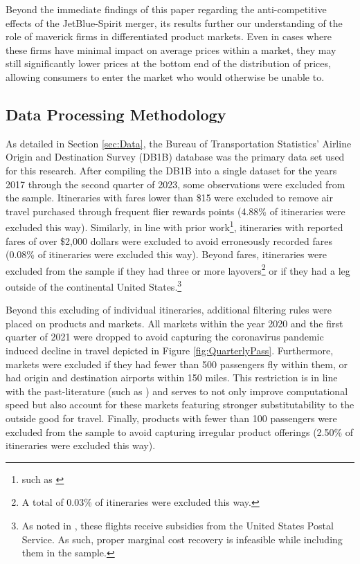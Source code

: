 \documentclass{article}
\begin{document}
    Beyond the immediate findings of this paper regarding the anti-competitive effects of the JetBlue-Spirit merger, its results further our understanding of the role of maverick firms in differentiated product markets. Even in cases where these firms have minimal impact on average prices within a market, they may still significantly lower prices at the bottom end of the distribution of prices, allowing consumers to enter the market who would otherwise be unable to. 
    
	
	\pagebreak 
	 
	
	\FloatBarrier
	
\pagebreak 
\begin{appendices}
\setcounter{table}{0}
\setcounter{figure}{0}
\renewcommand{\thetable}{\Alph{section}\arabic{table}}
\renewcommand{\thefigure}{\Alph{section}\arabic{figure}}

	\section{Data Processing Methodology}
	\label{sec:DataProcessing}
	As detailed in Section \ref{sec:Data},	the Bureau of Transportation Statistics' Airline Origin and Destination Survey (DB1B) database was the primary data set used for this research. After compiling the DB1B into a single dataset for the years 2017 through the second quarter of 2023, some observations were excluded from the sample. Itineraries with fares lower than \$15 were excluded to remove air travel purchased through frequent flier rewards points (4.88\% of itineraries were excluded this way). Similarly, in line with prior work\footnote{such as \citet{berry_tracing_2010}}, itineraries with reported fares of over \$2,000 dollars were excluded to avoid erroneously recorded fares (0.08\% of itineraries were excluded this way). Beyond fares, itineraries were excluded from the sample if they had three or more layovers\footnote{A total of 0.03\% of itineraries were excluded this way.} or if they had a leg outside of the continental United States.\footnote{As noted in \citet{ciliberto_market_2021}, these flights receive subsidies from the United States Postal Service. As such, proper marginal cost recovery is infeasible while including them in the sample.} 
	
	Beyond this excluding of individual itineraries, additional filtering rules were placed on products and markets. All markets within the year 2020 and the first quarter of 2021 were dropped to avoid capturing the coronavirus pandemic induced decline in travel depicted in Figure \ref{fig:QuarterlyPass}. Furthermore, markets were excluded if they had fewer than 500 passengers fly within them, or had origin and destination airports within 150 miles. This restriction is in line with the past-literature (such as \citet{ciliberto_does_2014}) and serves to not only improve computational speed but also account for these markets featuring stronger substitutability to the outside good for travel. Finally, products with fewer than 100 passengers were excluded from the sample to avoid capturing irregular product offerings (2.50\% of itineraries were excluded this way). 
    	

\end{appendices}
\end{document}
